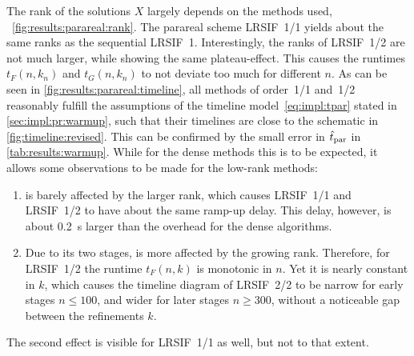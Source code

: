 The rank of the solutions $X$ largely depends on the methods used,
\cf~\autoref{fig:results:parareal:rank}.
The parareal scheme \ac{LRSIF}~1/1 yields about the same ranks as the sequential \ac{LRSIF}~1.
Interestingly, the ranks of \ac{LRSIF}~1/2 are not much larger,
while showing the same plateau-effect.
This causes the runtimes $t_F(n, k_n)$ and $t_G(n, k_n)$ to not deviate too much for different $n$.
As can be seen in \autoref{fig:results:parareal:timeline},
all methods of order~1/1 and~1/2
reasonably fulfill the assumptions of the timeline model~\eqref{eq:impl:tpar} stated in \autoref{sec:impl:pr:warmup},
such that their timelines are close to the schematic in \autoref{fig:timeline:revised}.
This can be confirmed by the small error in $\hat t_\text{par}$ in \autoref{tab:results:warmup}.
While for the dense methods this is to be expected,
it allows some observations to be made for the low-rank methods:
\begin{enumerate}
  \item
     is barely affected by the larger rank,
    which causes \ac{LRSIF}~1/1 and \ac{LRSIF}~1/2 to have about the same ramp-up delay.
    This delay, however, is about \SI[round-precision=1]{0.2}{\second} larger than the overhead for the dense algorithms.
  \item
    Due to its two stages,  is more affected by the growing rank.
    Therefore, for \ac{LRSIF}~1/2 the runtime $t_F(n, k)$ is monotonic in $n$.
    Yet it is nearly constant in $k$,
    which causes the timeline diagram of \ac{LRSIF}~2/2
    to be narrow for early stages $n \leq 100$,
    and wider for later stages $n \geq 300$,
    without a noticeable gap between the refinements $k$.
\end{enumerate}
The second effect is visible for \ac{LRSIF}~1/1 as well, but not to that extent.

